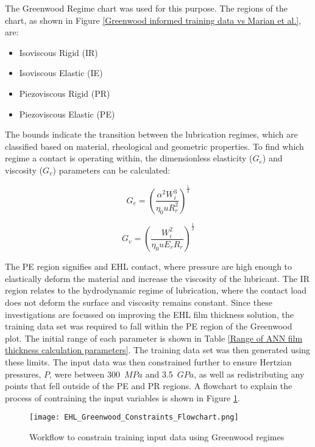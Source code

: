 The Greenwood Regime chart \cite{Johnson1970} was used for this purpose. The regions of the chart, as shown in Figure \ref{Greenwood informed training data vs Marian et al.}, are:

\begin{itemize}
	\item Isoviscous Rigid (IR)
	\item Isoviscous Elastic (IE)
	\item Piezoviscous Rigid (PR)
	\item Piezoviscous Elastic (PE)
\end{itemize}

The bounds indicate the transition between the lubrication regimes, which are classified based on material, rheological and geometric properties. To find which regime a contact is operating within, the dimensionless elasticity ($G_e$) and viscosity ($G_v$) parameters can be calculated:

\begin{equation}\label{G_e}
	G_e=\left(\frac{\alpha^2 W_i^3}{\eta_0 u R_r^2}\right)^{\frac{1}{2}}
\end{equation}

\begin{equation}\label{G_v}
	G_v=\left(\frac{W_i^2}{\eta_0 u E_r R_r}\right)^{\frac{1}{2}}
\end{equation}

The PE region signifies and EHL contact, where pressure are high enough to elastically deform the material and increase the viscosity of the lubricant. The IR region relates to the hydrodynamic regime of lubrication, where the contact load does not deform the surface and viscosity remains constant. Since these investigations are focussed on improving the EHL film thickness solution, the training data set was required to fall within the PE region of the Greenwood plot. The initial range of each parameter is shown in Table \ref{Range of ANN film thickness calculation parameters}. The training data set was then generated using these limits. The input data was then constrained further to ensure Hertzian pressures, $P$, were between 300~$MPa$ and 3.5~$GPa$, as well as redistributing any points that fell outside of the PE and PR regions. A flowchart to explain the process of contraining the input variables is shown in Figure \ref{EHL_Greenwood_Constraints_Flowchart}.

\begin{figure}
	\centering  
	\texttt{[image: EHL\_Greenwood\_Constraints\_Flowchart.png]}
	\caption{Workflow to constrain training input data using Greenwood regimes}
	\label{EHL_Greenwood_Constraints_Flowchart}
\end{figure} 

